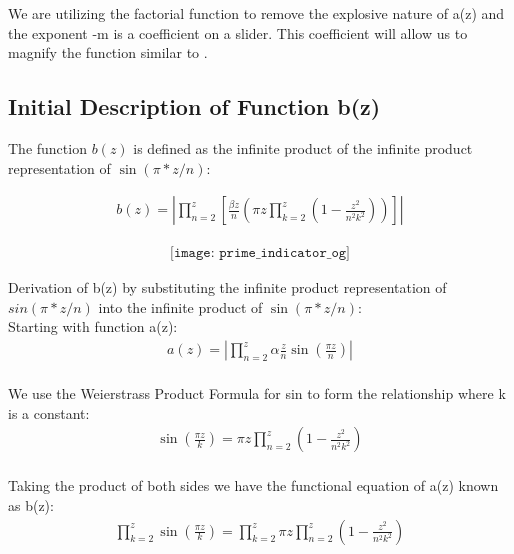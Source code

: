 \documentclass{article}
\begin{document}
We are utilizing the factorial function to remove the explosive nature of a(z) and the exponent -m is a coefficient on a slider. This coefficient will allow us to magnify the function similar to \alpha.

\subsection*{Initial Description of Function b(z)}
The function $b(z)$ is defined as the infinite product of the infinite product representation of $\sin(\pi*z/n)$:

\begin{align*}
	b(z) = |\prod_{n=2}^z \left[\frac{\beta z}{n}\left({\pi z}\prod_{k=2}^z\left(1 - \frac{z^2}{n^2k^2}\right)\right)\right]|
\end{align*}

\begin{align*}
\texttt{[image: prime\_indicator\_og]}
\end{align*}

Derivation of b(z) by substituting the infinite product representation of $sin(\pi*z/n)$ into the infinite product of $\sin(\pi*z/n)$: \\

Starting with function a(z): \\
\begin{align*}
	a(z) = |\prod_{n=2}^z \alpha\frac{z}{n}\sin\left(\frac{\pi z}{n}\right)| \\
\end{align*}

We use the Weierstrass Product Formula for sin to form the relationship where k is a constant: \\
\begin{align*}
	\sin\left(\frac{\pi z}{k}\right) = \pi z\prod_{n=2}^z \left(1-\frac{z^2}{n^2k^2}\right) \\
\end{align*}

Taking the product of both sides we have the functional equation of a(z) known as b(z): \\
\begin{align*}
	\prod_{k=2}^z\sin\left(\frac{\pi z}{k}\right) = \prod_{k=2}^z \pi z\prod_{n=2}^z \left(1-\frac{z^2}{n^2k^2}\right) \\
\end{align*}
\end{document}
